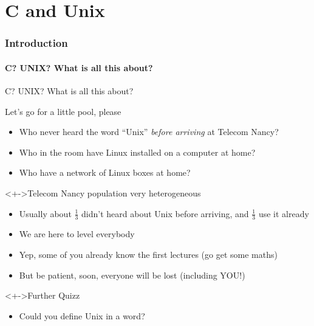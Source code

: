 \part{C and Unix}\toc
\section{Introduction}
\subsection{C? UNIX? What is all this about?}
\begin{frame}{C? UNIX? What is all this about?}
  \begin{block}{Let's go for a little pool, please}
    \begin{itemize}
    \item<+-> Who never heard the word ``Unix'' \textit{before arriving} at
      Telecom Nancy?
    \item<+-> Who in the room have Linux installed on a computer at home?
    \item<+-> Who have a network of Linux boxes at home?
    \end{itemize}
  \end{block}

  \begin{block}<+->{Telecom Nancy population very heterogeneous}
    \begin{itemize}
    \item Usually about $\frac{1}{3}$ didn't heard about Unix before arriving,
      and $\frac{1}{3}$ use it already
    \item We are here to level everybody
    \item Yep, some of you already know the first lectures
      {\small(go get some maths)}
    \item But be patient, soon, everyone will be lost (including YOU!)
    \end{itemize}
  \end{block}

  \begin{block}<+->{Further Quizz}
    \begin{itemize}
    \item Could you define Unix in a word? 
    \end{itemize}
  \end{block}
\end{frame}
